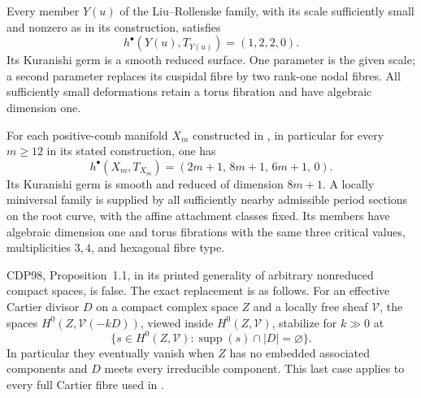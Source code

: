 \begin{proposition}\label{cdp:st:E14}

Every member $Y(u)$ of the Liu--Rollenske family, with its scale
sufficiently small and nonzero as in its construction, satisfies
\[
 h^\bullet(Y(u),T_{Y(u)})=(1,2,2,0).
\]
Its Kuranishi germ is a smooth reduced surface. One parameter is
the given scale; a second parameter replaces its cuspidal fibre by
two rank-one nodal fibres. All sufficiently small deformations
retain a torus fibration and have algebraic dimension one.
\end{proposition}

\begin{proposition}\label{cdp:st:E15}

For each positive-comb manifold $X_m$ constructed in
\cite{Viaclovsky2026Combs}, in particular for every $m\geq12$ in
its stated construction, one has
\[
 h^\bullet(X_m,T_{X_m})=(2m+1,\,8m+1,\,6m+1,\,0).
\]
Its Kuranishi germ is smooth and reduced of dimension $8m+1$.
A locally miniversal family is supplied by all sufficiently nearby
admissible period sections on the root curve, with the affine
attachment classes fixed. Its members have algebraic dimension one
and torus fibrations with the same three critical values,
multiplicities $3,4$, and hexagonal fibre type.
\end{proposition}

\begin{proposition}\label{cdp:st:E17}

CDP98, Proposition~1.1, in its printed generality of arbitrary
nonreduced compact spaces, is false. The exact replacement is as
follows. For an effective Cartier divisor $D$ on a compact complex
space $Z$ and a locally free sheaf $\mathcal V$, the spaces
$H^0(Z,\mathcal V(-kD))$, viewed inside $H^0(Z,\mathcal V)$,
stabilize for $k\gg0$ at
\[
 \{s\in H^0(Z,\mathcal V):\operatorname{supp}(s)\cap|D|
       =\varnothing\}.
\]
In particular they eventually vanish when $Z$ has no embedded
associated components and $D$ meets every irreducible component.
This last case applies to every full Cartier fibre used in .
\end{proposition}

